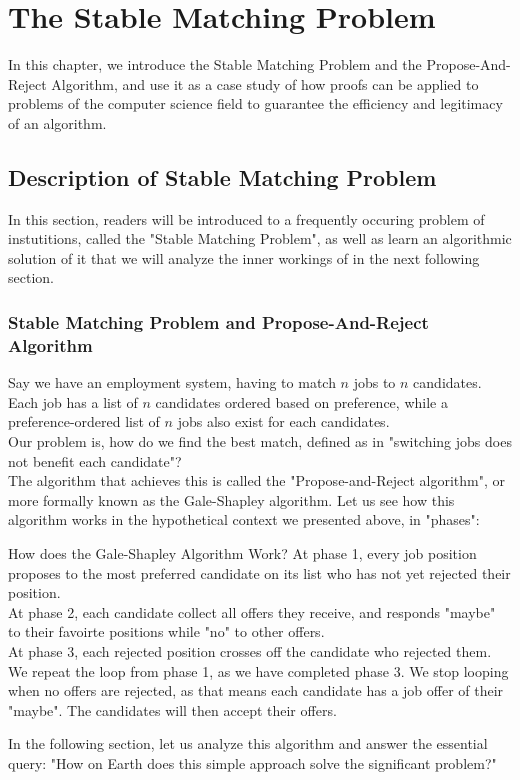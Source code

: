 \chapter{The Stable Matching Problem}
In this chapter, we introduce the Stable Matching Problem and the Propose-And-Reject Algorithm, and use it as a case study of how proofs can be applied to problems of the computer science field to guarantee the efficiency and legitimacy of an algorithm.

\section{Description of Stable Matching Problem}
In this section, readers will be introduced to a frequently occuring problem of instutitions, called the "Stable Matching Problem", as well as learn an algorithmic solution of it that we will analyze the inner workings of in the next following section.

\subsection{Stable Matching Problem and Propose-And-Reject Algorithm}
Say we have an employment system, having to match $n$ jobs to $n$ candidates. Each job has a list of $n$ candidates ordered based on preference, while a preference-ordered list of $n$ jobs also exist for each candidates. \\
Our problem is, how do we find the best match, defined as in "switching jobs does not benefit each candidate"? \\
The algorithm that achieves this is called the "Propose-and-Reject algorithm", or more formally known as the Gale-Shapley algorithm. Let us see how this algorithm works in the hypothetical context we presented above, in "phases":
\begin{ln-think}{How does the Gale-Shapley Algorithm Work?}{}
    At phase 1, every job position proposes to the most preferred candidate on its list who has not yet rejected their position. \\
    At phase 2, each candidate collect all offers they receive, and responds "maybe" to their favoirte positions while "no" to other offers. \\
    At phase 3, each rejected position crosses off the candidate who rejected them. \\
    We repeat the loop from phase 1, as we have completed phase 3. We stop looping when no offers are rejected, as that means each candidate has a job offer of their "maybe". The candidates will then accept their offers.
\end{ln-think}
In the following section, let us analyze this algorithm and answer the essential query: "How on Earth does this simple approach solve the significant problem?"

